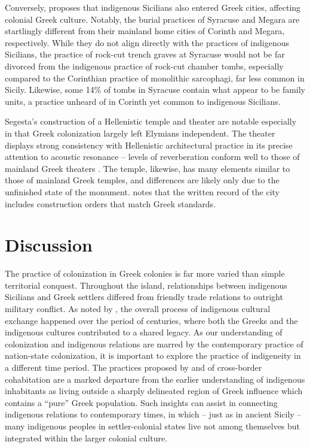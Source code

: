 \documentclass[american]{../../../coursework}
\begin{document}
Conversely, \textcite{Lei99} proposes that indigenous Sicilians also entered
Greek cities, affecting colonial Greek culture. Notably, the burial practices
of Syracuse and Megara are startlingly different from their mainland home
cities of Corinth and Megara, respectively. While they do not align directly
with the practices of indigenous Sicilians, the practice of rock-cut trench
graves at Syracuse would not be far divorced from the indigenous practice of
rock-cut chamber tombs, especially compared to the Corinthian practice of
monolithic sarcophagi, far less common in Sicily. Likewise, some 14\% of tombs
in Syracuse contain what appear to be family units, a practice unheard of in
Corinth yet common to indigenous Sicilians.

Segesta's construction of a Hellenistic temple and theater are notable
especially in that Greek colonization largely left Elymians independent. The
theater displays strong consistency with Hellenistic architectural practice in
its precise attention to acoustic resonance -- levels of reverberation conform
well to those of mainland Greek theaters \parencite{Dan04}. The temple,
likewise, has many elements similar to those of mainland Greek temples, and
differences are likely only due to the unfinished state of the monument.
\textcite{Bur61} notes that the written record of the city includes
construction orders that match Greek standards.

\section{Discussion}

The practice of colonization in Greek colonies is far more varied than simple
territorial conquest. Throughout the island, relationships between indigenous
Sicilians and Greek settlers differed from friendly trade relations to
outright military conflict. As noted by \textcite{Bal12}, the overall process
of indigenous cultural exchange happened over the period of centuries, where
both the Greeks and the indigenous cultures contributed to a shared legacy. As
our understanding of colonization and indigenous relations are marred by the
contemporary practice of nation-state colonization, it is important to explore
the practice of indigeneity in a different time period. The practices proposed
by \textcite{Boa80} and \textcite{Lei99} of cross-border cohabitation are a
marked departure from the earlier understanding of indigenous inhabitants as
living outside a sharply delineated region of Greek influence which contains a
``pure'' Greek population. Such insights can assist in connecting indigenous
relations to contemporary times, in which -- just as in ancient Sicily -- many
indigenous peoples in settler-colonial states live not among themselves but
integrated within the larger colonial culture.

\printbibliography
\end{document}
